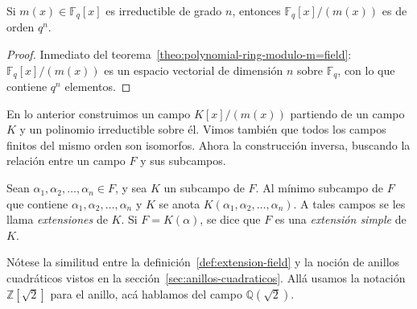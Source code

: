   \begin{corollary}
    \label{cor:fielp-p^n}
    Si \(m(x) \in \mathbb{F}_q [x]\) es irreductible
    de grado \(n\),
    entonces \(\mathbb{F}_q[x] / (m(x))\) es de orden \(q^n\).
  \end{corollary}
  \begin{proof}
    Inmediato del teorema~\ref{theo:polynomial-ring-modulo-m=field}:
    \(\mathbb{F}_q[x] / (m(x))\)
    es un espacio vectorial de dimensión \(n\)
    sobre \(\mathbb{F}_q\),
    con lo que contiene \(q^n\) elementos.
  \end{proof}
  En lo anterior construimos un campo \(K[x] / (m(x))\)
  partiendo de un campo \(K\) y un polinomio irreductible sobre él.
  Vimos también que todos los campos finitos del mismo orden
  son isomorfos.
  Ahora la construcción inversa,
  buscando la relación entre un campo \(F\) y sus subcampos.
  \begin{definition}
    \label{def:extension-field}
    Sean \(\alpha_1, \alpha_2, \dotsc, \alpha_n \in F\),
    y sea \(K\) un subcampo de \(F\).
    Al mínimo subcampo de \(F\)
    que contiene \(\alpha_1, \alpha_2, \dotsc, \alpha_n\) y \(K\)
    se anota \(K(\alpha_1, \alpha_2, \dotsc, \alpha_n)\).
    A tales campos se les llama \emph{extensiones} de \(K\).%
    Si \(F = K(\alpha)\),
    se dice que \(F\) es una \emph{extensión simple} de \(K\).%
  \end{definition}
  Nótese la similitud entre la definición~\ref{def:extension-field}
  y la noción de anillos cuadráticos%
  vistos en la sección~\ref{sec:anillos-cuadraticos}.
  Allá usamos la notación \(\mathbb{Z}[\sqrt{2}]\) para el anillo,
  acá hablamos del campo \(\mathbb{Q}(\sqrt{2})\).

